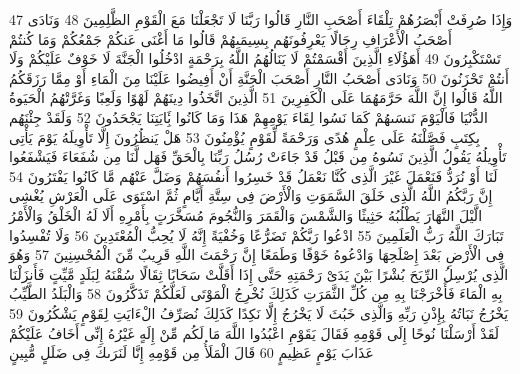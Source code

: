 \documentclass[20pt,a4paper]{article}
\begin{document}
{\tiny\colorbox{cl_aya}{47}} وَإِذَا صُرِفَتْ أَبْصَرُهُمْ تِلْقَاءَ أَصْحَبِ النَّارِ قَالُوا رَبَّنَا لَا تَجْعَلْنَا مَعَ الْقَوْمِ الظَّلِمِينَ
{\tiny\colorbox{cl_aya}{48}} وَنَادَى أَصْحَبُ الْأَعْرَافِ رِجَالًا يَعْرِفُونَهُم بِسِيمَىهُمْ قَالُوا مَا أَغْنَى عَنكُمْ جَمْعُكُمْ وَمَا كُنتُمْ تَسْتَكْبِرُونَ
{\tiny\colorbox{cl_aya}{49}} أَهَؤُلَاءِ الَّذِينَ أَقْسَمْتُمْ لَا يَنَالُهُمُ اللَّهُ بِرَحْمَةٍ ادْخُلُوا الْجَنَّةَ لَا خَوْفٌ عَلَيْكُمْ وَلَا أَنتُمْ تَحْزَنُونَ
{\tiny\colorbox{cl_aya}{50}} وَنَادَى أَصْحَبُ النَّارِ أَصْحَبَ الْجَنَّةِ أَنْ أَفِيضُوا عَلَيْنَا مِنَ الْمَاءِ أَوْ مِمَّا رَزَقَكُمُ اللَّهُ قَالُوا إِنَّ اللَّهَ حَرَّمَهُمَا عَلَى الْكَفِرِينَ
{\tiny\colorbox{cl_aya}{51}} الَّذِينَ اتَّخَذُوا دِينَهُمْ لَهْوًا وَلَعِبًا وَغَرَّتْهُمُ الْحَيَوةُ الدُّنْيَا فَالْيَوْمَ نَنسَىهُمْ كَمَا نَسُوا لِقَاءَ يَوْمِهِمْ هَذَا وَمَا كَانُوا بَِٔايَتِنَا يَجْحَدُونَ
{\tiny\colorbox{cl_aya}{52}} وَلَقَدْ جِئْنَهُم بِكِتَبٍ فَصَّلْنَهُ عَلَى عِلْمٍ هُدًى وَرَحْمَةً لِّقَوْمٍ يُؤْمِنُونَ
{\tiny\colorbox{cl_aya}{53}} هَلْ يَنظُرُونَ إِلَّا تَأْوِيلَهُ يَوْمَ يَأْتِى تَأْوِيلُهُ يَقُولُ الَّذِينَ نَسُوهُ مِن قَبْلُ قَدْ جَاءَتْ رُسُلُ رَبِّنَا بِالْحَقِّ فَهَل لَّنَا مِن شُفَعَاءَ فَيَشْفَعُوا لَنَا أَوْ نُرَدُّ فَنَعْمَلَ غَيْرَ الَّذِى كُنَّا نَعْمَلُ قَدْ خَسِرُوا أَنفُسَهُمْ وَضَلَّ عَنْهُم مَّا كَانُوا يَفْتَرُونَ
{\tiny\colorbox{cl_aya}{54}} إِنَّ رَبَّكُمُ اللَّهُ الَّذِى خَلَقَ السَّمَوَتِ وَالْأَرْضَ فِى سِتَّةِ أَيَّامٍ ثُمَّ اسْتَوَى عَلَى الْعَرْشِ يُغْشِى الَّيْلَ النَّهَارَ يَطْلُبُهُ حَثِيثًا وَالشَّمْسَ وَالْقَمَرَ وَالنُّجُومَ مُسَخَّرَتٍ بِأَمْرِهِ أَلَا لَهُ الْخَلْقُ وَالْأَمْرُ تَبَارَكَ اللَّهُ رَبُّ الْعَلَمِينَ
{\tiny\colorbox{cl_aya}{55}} ادْعُوا رَبَّكُمْ تَضَرُّعًا وَخُفْيَةً إِنَّهُ لَا يُحِبُّ الْمُعْتَدِينَ
{\tiny\colorbox{cl_aya}{56}} وَلَا تُفْسِدُوا فِى الْأَرْضِ بَعْدَ إِصْلَحِهَا وَادْعُوهُ خَوْفًا وَطَمَعًا إِنَّ رَحْمَتَ اللَّهِ قَرِيبٌ مِّنَ الْمُحْسِنِينَ
{\tiny\colorbox{cl_aya}{57}} وَهُوَ الَّذِى يُرْسِلُ الرِّيَحَ بُشْرًا بَيْنَ يَدَىْ رَحْمَتِهِ حَتَّى إِذَا أَقَلَّتْ سَحَابًا ثِقَالًا سُقْنَهُ لِبَلَدٍ مَّيِّتٍ فَأَنزَلْنَا بِهِ الْمَاءَ فَأَخْرَجْنَا بِهِ مِن كُلِّ الثَّمَرَتِ كَذَلِكَ نُخْرِجُ الْمَوْتَى لَعَلَّكُمْ تَذَكَّرُونَ
{\tiny\colorbox{cl_aya}{58}} وَالْبَلَدُ الطَّيِّبُ يَخْرُجُ نَبَاتُهُ بِإِذْنِ رَبِّهِ وَالَّذِى خَبُثَ لَا يَخْرُجُ إِلَّا نَكِدًا كَذَلِكَ نُصَرِّفُ الْءَايَتِ لِقَوْمٍ يَشْكُرُونَ
{\tiny\colorbox{cl_aya}{59}} لَقَدْ أَرْسَلْنَا نُوحًا إِلَى قَوْمِهِ فَقَالَ يَقَوْمِ اعْبُدُوا اللَّهَ مَا لَكُم مِّنْ إِلَهٍ غَيْرُهُ إِنِّى أَخَافُ عَلَيْكُمْ عَذَابَ يَوْمٍ عَظِيمٍ
{\tiny\colorbox{cl_aya}{60}} قَالَ الْمَلَأُ مِن قَوْمِهِ إِنَّا لَنَرَىكَ فِى ضَلَلٍ مُّبِينٍ
\end{document}
